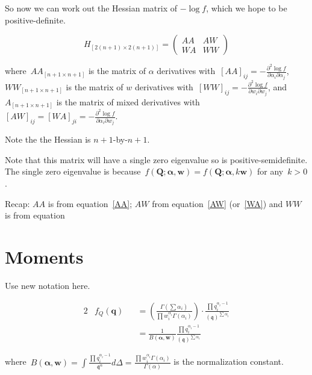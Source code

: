 \documentclass[nojss]{jss}
\newcommand{\ba}{\boldsymbol\alpha}
\newcommand{\bw}{\mathbf{w}}
\begin{document}
So now we can work out the Hessian matrix of $-\log f$, which we hope to be positive-definite.  


\begin{equation}
  H_{[2(n+1)\times 2(n+1)]} = \left(\begin{array}{cc} AA & AW\\ WA &
    WW
    \end{array}
  \right)
  \end{equation}

where~$AA_{[n+1\times n+1]}$ is the matrix of $\alpha$ derivatives
with~$[AA]_{ij} = -\frac{\partial^2\log
  f}{\partial\alpha_i\partial\alpha_j}$, $WW_{[n+1\times n+1]}$ is the
matrix of $w$ derivatives with~$[WW]_{ij}= -\frac{\partial^2\log
  f}{\partial w_i\partial w_j}$, and~$A_{[n+1\times n+1]}$ is the
matrix of mixed derivatives
with~$[AW]_{ij}=[WA]_{ji}=-\frac{\partial^2\log
  f}{\partial\alpha_i\partial w_j}$.

Note the the Hessian is $n+1$-by-$n+1$.

Note that this matrix will have a single zero eigenvalue so is
positive-semidefinite.  The single zero eigenvalue is
because~$f\left(\mathbf{Q};\mathbf{\alpha},\mathbf{w}\right) =
f\left(\mathbf{Q};\mathbf{\alpha},k\mathbf{w}\right)$ for any~$k>0$.

Recap: $AA$ is from equation~\ref{AA}; $AW$ from equation~\ref{AW}
(or~\ref{WA}) and $WW$ is from equation





\section{Moments}

Use new notation here.


\begin{alignat}{2}
&  f_Q\left(\mathbf{q}\right) &&= \left(
  \frac{\Gamma\left(\sum\alpha_i\right)
  }{
    \prod w_i^{\alpha_i}\Gamma\left(\alpha_i\right)
  }
  \right)  \cdot
  \frac{\prod q_i^{\alpha_i-1}
  }{
    \left(\mathfrak{q}\right)^{\sum\alpha_i}
  }\\
  & && = \frac{1}{B\left(\ba,\bw\right)}
  \frac{\prod q_i^{\alpha_i-1}
  }{
    \left(\mathfrak{q}\right)^{\sum\alpha_i}
  }
  \end{alignat}


where~$B(\ba,\bw) = \int\frac{\prod q_i^{\alpha_i-1}
  }{
    \mathfrak{q}^\alpha
  }d\Delta = \frac{
    \prod w_i^{\alpha_i}\Gamma\left(\alpha_i\right)
  }{
  \Gamma\left(\alpha\right)
  }$ is the normalization constant.
\end{document}
